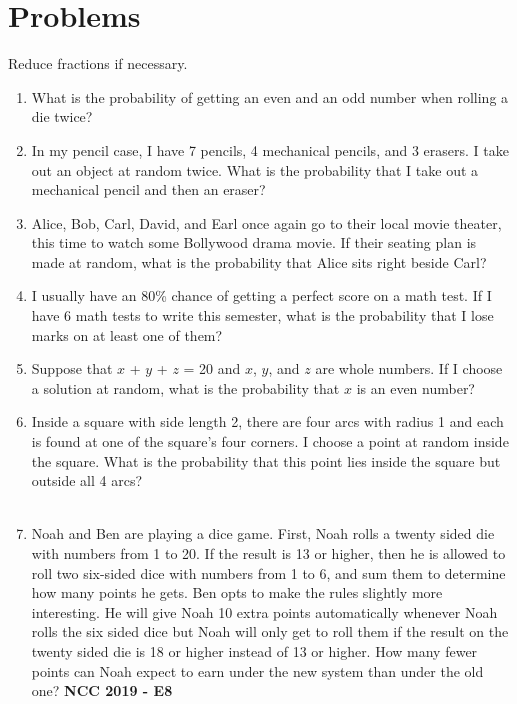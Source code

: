 \documentclass[12pt]{extarticle}
\begin{document}
\section{Problems}
{Reduce fractions if necessary.}
\begin{enumerate}
    \itemsep 2.0em
    \item {What is the probability of getting an even and an odd number when rolling a die twice?}
    \item {In my pencil case, I have 7 pencils, 4 mechanical pencils, and 3 erasers. I take out an object at random twice. What is the probability that I take out a mechanical pencil and then an eraser?}
    \item {Alice, Bob, Carl, David, and Earl once again go to their local movie theater, this time to watch some Bollywood drama movie. If their seating plan is made at random, what is the probability that Alice sits right beside Carl?}
    \item {I usually have an 80\% chance of getting a perfect score on a math test. If I have 6 math tests to write this semester, what is the probability that I lose marks on at least one of them?}
    \item {Suppose that $x$ + $y$ + $z$ = 20 and $x$, $y$, and $z$ are whole numbers. If I choose a solution at random, what is the probability that $x$ is an even number?}
    \item {Inside a square with side length 2, there are four arcs with radius 1 and each is found at one of the square's four corners. I choose a point at random inside the square. What is the probability that this point lies inside the square but outside all 4 arcs?\\\\
    }
    \item {Noah and Ben are playing a dice game. First, Noah rolls a twenty sided die with numbers from 1 to 20. If the result is 13 or higher, then he is allowed to roll two six-sided dice with numbers from 1 to 6, and sum them to determine how many points he gets. Ben opts to make the rules slightly more interesting. He will give Noah 10 extra points automatically whenever Noah rolls the six sided dice but Noah will only get to roll them if the result on the twenty sided die is 18 or higher instead of 13 or higher. How many fewer points can Noah expect to earn under the new system than under the old one? \textbf{NCC 2019 - E8}}
\end{enumerate}
\end{document}
